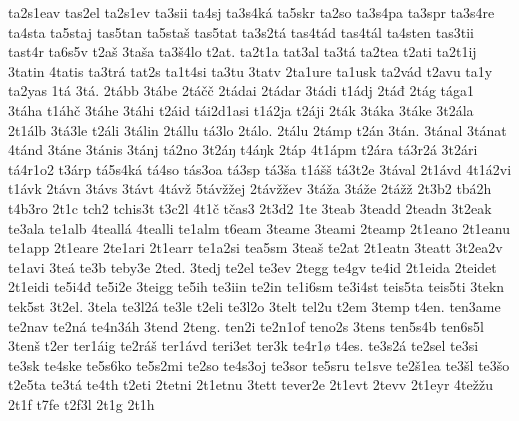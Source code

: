 {    ta2s1eav
    tas2el
    ta2s1ev
    ta3sii
    ta4sj
    ta3s4ká
    ta5skr
    ta2so
    ta3s4pa
    ta3spr
    ta3s4re
    ta4sta
    ta5staj
    tas5tan
    ta5staš
    tas5tat
    ta3s2tá
    tas4tád
    tas4tál
    ta4sten
    tas3tii
    tast4r
    ta6s5v
    t2aš
    3taša
    ta3š4lo
    t2at.
    ta2t1a
    tat3al
    ta3tá
    ta2tea
    t2ati
    ta2t1ij
    3tatin
    4tatis
    ta3trá
    tat2s
    ta1t4si
    ta3tu
    3tatv
    2ta1ure
    ta1usk
    ta2vád
    t2avu
    ta1y
    ta2yas
    1tá
    3tá.
    2tább
    3tábe
    2táčč
    2tádai
    2tádar
    3tádi
    t1ádj
    2táđ
    2tág
    tága1
    3táha
    t1áhč
    3táhe
    3táhi
    t2áid
    tái2d1asi
    t1á2ja
    t2áji
    2ták
    3táka
    3táke
    3t2ála
    2t1álb
    3tá3le
    t2áli
    3tálin
    2tállu
    tá3lo
    2tálo.
    2tálu
    2támp
    t2án
    3tán.
    3tánal
    3tánat
    4tánd
    3táne
    3tánis
    3tánj
    tá2no
    3t2áŋ
    t4áŋk
    2táp
    4t1ápm
    t2ára
    tá3r2á
    3t2ári
    tá4r1o2
    t3árp
    tá5s4ká
    tá4so
    tás3oa
    tá3sp
    tá3ša
    t1ášš
    tá3t2e
    3tával
    2t1ávd
    4t1á2vi
    t1ávk
    2távn
    3távs
    3távt
    4távž
    5távžžej
    2távžžev
    3táža
    3táže
    2tážž
    2t3b2
    tbá2h
    t4b3ro
    2t1c
    tch2
    tchis3t
    t3c2l
    4t1č
    tčas3
    2t3d2
    1te
    3teab
    3teadd
    2teadn
    3t2eak
    te3ala
    te1alb
    4teallá
    4tealli
    te1alm
    t6eam
    3teame
    3teami
    2teamp
    2t1eano
    2t1eanu
    te1app
    2t1eare
    2te1ari
    2t1earr
    te1a2si
    tea5sm
    3teaš
    te2at
    2t1eatn
    3teatt
    3t2ea2v
    te1avi
    3teá
    te3b
    teby3e
    2ted.
    3tedj
    te2el
    te3ev
    2tegg
    te4gv
    te4id
    2t1eida
    2teidet
    2t1eidi
    te5i4đ
    te5i2e
    3teigg
    te5ih
    te3iin
    te2in
    te1i6sm
    te3i4st
    teis5ta
    teis5ti
    3tekn
    tek5st
    3t2el.
    3tela
    te3l2á
    te3le
    t2eli
    te3l2o
    3telt
    tel2u
    t2em
    3temp
    t4en.
    ten3ame
    te2nav
    te2ná
    te4n3áh
    3tend
    2teng.
    ten2i
    te2n1of
    teno2s
    3tens
    ten5s4b
    ten6s5l
    3tenš
    t2er
    ter1áig
    te2ráš
    ter1ávd
    teri3et
    ter3k
    te4r1ø
    t4es.
    te3s2á
    te2sel
    te3si
    te3sk
    te4ske
    te5s6ko
    te5s2mi
    te2so
    te4s3oj
    te3sor
    te5sru
    te1sve
    te2š1ea
    te3šl
    te3šo
    t2e5ta
    te3tá
    te4th
    t2eti
    2tetni
    2t1etnu
    3tett
    tever2e
    2t1evt
    2tevv
    2t1eyr
    4težžu
    2t1f
    t7fe
    t2f3l
    2t1g
    2t1h
}
